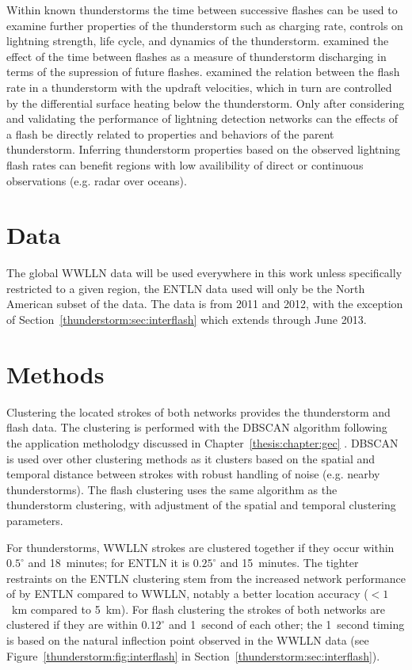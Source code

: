 Within known thunderstorms the time between successive flashes can be used to examine further properties of the thunderstorm such as charging rate, controls on lightning strength, life cycle, and dynamics of the thunderstorm.
\citet{Zoghzoghy2013} examined the effect of the time between flashes as a measure of thunderstorm discharging in terms of the supression of future flashes.
\citet{Zipser1994} examined the relation between the flash rate in a thunderstorm with the updraft velocities, which in turn are controlled by the differential surface heating below the thunderstorm.
Only after considering and validating the performance of lightning detection networks can the effects of a flash be directly related to properties and behaviors of the parent thunderstorm.
Inferring thunderstorm properties based on the observed lightning flash rates can benefit regions with low availibility of direct or continuous observations (e.g. radar over oceans).

\section{Data}

The global WWLLN data will be used everywhere in this work unless specifically restricted to a given region, the ENTLN data used will only be the North American subset of the data.
The data is from 2011 and 2012, with the exception of Section~\ref{thunderstorm:sec:interflash} which extends through June 2013.

\section{Methods}

Clustering the located strokes of both networks provides the thunderstorm and flash data.
The clustering is performed with the DBSCAN algorithm \citep{Ester1996, Kriegel2011a} following the application metholodgy discussed in Chapter~\ref{thesis:chapter:gec} \citep{Hutchins2014}.
DBSCAN is used over other clustering methods as it clusters based on the spatial and temporal distance between strokes with robust handling of noise (e.g. nearby thunderstorms).
The flash clustering uses the same algorithm as the thunderstorm clustering, with adjustment of the spatial and temporal clustering parameters.

For thunderstorms, WWLLN strokes are clustered together if they occur within $0.5^\circ$ and 18~minutes; for ENTLN it is $0.25^\circ$ and 15~minutes.
The tighter restraints on the ENTLN clustering stem from the increased network performance of by ENTLN compared to WWLLN, notably a better location accuracy ($<1$~km compared to 5~km).
For flash clustering the strokes of both networks are clustered if they are within $0.12^\circ$ and 1~second of each other; the 1~second timing is based on the natural inflection point observed in the WWLLN data (see Figure~\ref{thunderstorm:fig:interflash} in Section~\ref{thunderstorm:sec:interflash}).


